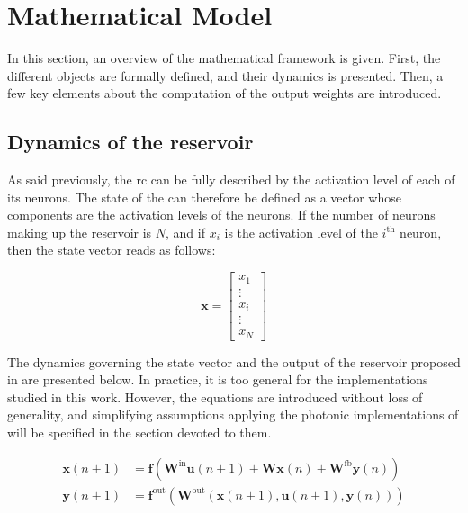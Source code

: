 
\section{Mathematical Model}

\label{rc-mathematical-model}

In this section, an overview of the mathematical framework is given. First, the different objects are formally defined, and their dynamics is presented. Then, a few key elements about the computation of the output weights are introduced.


\subsection{Dynamics of the reservoir}

As said previously, the \gls{rc} can be fully described by the activation level of each of its neurons. The state of the \rcer can therefore be defined as a vector whose components are the activation levels of the neurons. If the number of neurons making up the reservoir is $N$, and if $x_i$ is the activation level of the $i^{\text{th}}$ neuron, then the state vector reads as follows:

\begin{equation}
	\mathbf{x} = \begin{bmatrix}
		x_1\\
		\vdots \\
		x_i \\
		\vdots \\
		x_N
	\end{bmatrix}
\end{equation}

The dynamics governing the state vector and the output of the reservoir proposed in \cite{JaegerH.2001Tesa} are presented below. In practice, it is too general for the implementations studied in this work. However, the equations are introduced without loss of generality, and simplifying assumptions applying the photonic implementations of \rcer will be specified in the section devoted to them.

\begin{align}
	\mathbf{x}(n+1) &= \mathbf{f} \left( \mathbf{W}^{\text{in}} \mathbf{u}(n+1) + \mathbf{W} \mathbf{x}(n) + \mathbf{W}^{\text{fb}} \mathbf{y}(n) \right) \label{rc_dynamics}\\
	\mathbf{y}(n+1) &= \mathbf{f}^{\text{out}} \left( \mathbf{W}^{\text{out}} \left(\mathbf{x}(n+1), \mathbf{u}(n+1), \mathbf{y}(n)\right) \right) \label{rc_output}
\end{align}


